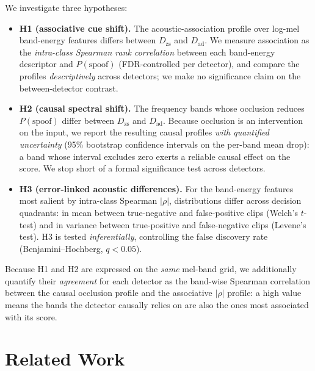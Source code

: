 \documentclass[sigconf]{acmart}
\begin{document}
We investigate three hypotheses:
\begin{itemize}
  \item \textbf{H1 (associative cue shift).} The acoustic-association profile
        over log-mel band-energy features differs between $D_{\mathrm{zs}}$ and
        $D_{\mathrm{ad}}$. We measure association as the \emph{intra-class Spearman
        rank correlation} between each band-energy descriptor and
        $P(\mathrm{spoof})$ (FDR-controlled per detector), and compare the profiles
        \emph{descriptively} across detectors; we make no significance claim on the
        between-detector contrast.
  \item \textbf{H2 (causal spectral shift).} The frequency bands whose occlusion
        reduces $P(\mathrm{spoof})$ differ between $D_{\mathrm{zs}}$ and
        $D_{\mathrm{ad}}$. Because occlusion is an intervention on the input, we
        report the resulting causal profiles \emph{with quantified uncertainty}
        (95\% bootstrap confidence intervals on the per-band mean drop): a band
        whose interval excludes zero exerts a reliable causal effect on the
        score. We stop short of a formal significance test across detectors.
  \item \textbf{H3 (error-linked acoustic differences).} For the band-energy
        features most salient by intra-class Spearman $|\rho|$, distributions
        differ across decision quadrants:
        in mean between true-negative and false-positive clips (Welch's
        $t$-test) and in variance between true-positive and false-negative clips
        (Levene's test). H3 is tested \emph{inferentially}, controlling the
        false discovery rate (Benjamini--Hochberg, $q<0.05$).
\end{itemize}

Because H1 and H2 are expressed on the \emph{same} mel-band grid, we additionally
quantify their \emph{agreement} for each detector as the band-wise Spearman
correlation between the causal occlusion profile and the associative $|\rho|$
profile: a high value means the bands the detector causally relies on are also the
ones most associated with its score.

\section{Related Work}
\end{document}
